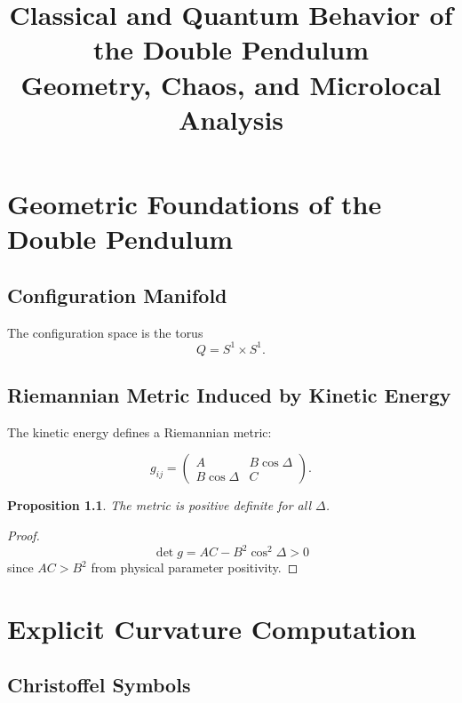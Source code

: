 \documentclass{book}
\title{Classical and Quantum Behavior of the Double Pendulum\\
\large Geometry, Chaos, and Microlocal Analysis}
\author{ }
\newtheorem{proposition}[theorem]{Proposition}
\begin{document}
\maketitle
\frontmatter
\tableofcontents

\mainmatter

\chapter{Geometric Foundations of the Double Pendulum}

\section{Configuration Manifold}

The configuration space is the torus
\[
Q = S^1 \times S^1.
\]


\section{Riemannian Metric Induced by Kinetic Energy}

The kinetic energy defines a Riemannian metric:

\[
g_{ij} =
\begin{pmatrix}
A & B\cos\Delta\\
B\cos\Delta & C
\end{pmatrix}.
\]

\begin{proposition}
The metric is positive definite for all $\Delta$.
\end{proposition}

\begin{proof}
\[
\det g = AC - B^2 \cos^2\Delta > 0
\]
since $AC > B^2$ from physical parameter positivity.
\end{proof}


\chapter{Explicit Curvature Computation}

\section{Christoffel Symbols}
\end{document}
